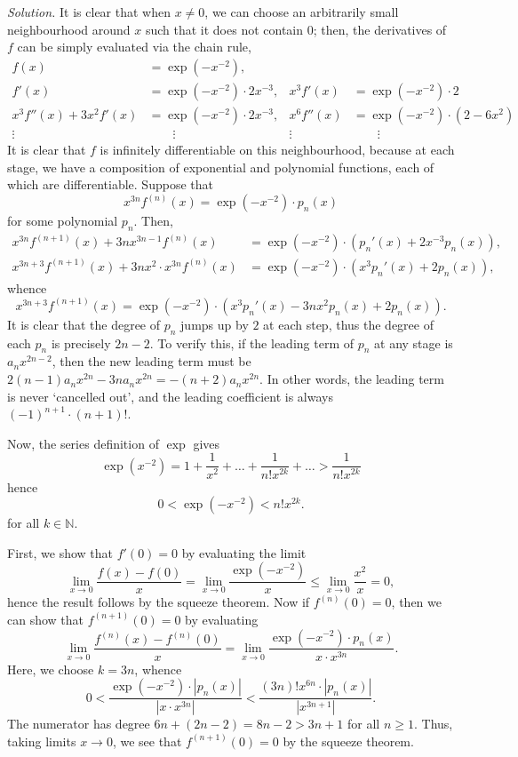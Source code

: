 \documentclass[11pt]{report}
\newcommand{\N}{\mathbb{N}}
\newcommand{\solution}{\noindent\textit{Solution.} }
\begin{document}
    \solution It is clear that when $x \neq 0$, we can choose an arbitrarily small
    neighbourhood around $x$ such that it does not contain $0$; then, the derivatives
    of $f$ can be simply evaluated via the chain rule, \begin{align*}
        f(x) &= \exp(-x^{-2}), \\
        f'(x) &= \exp(-x^{-2}) \cdot 2x^{-3}, & x^3 f'(x) &= \exp(-x^{-2})\cdot 2 \\
        x^3f''(x) + 3x^2f'(x) &= \exp(-x^{-2})\cdot 2x^{-3}, &
            x^6 f''(x) &= \exp(-x^{-2})\cdot (2 - 6x^2)\\
        \vdots & \qquad \vdots & \vdots & \qquad \vdots
    \end{align*}
    It is clear that $f$ is infinitely differentiable on this neighbourhood, because
    at each stage, we have a composition of exponential and polynomial functions,
    each of which are differentiable. Suppose that \[
        x^{3n}f^{(n)}(x) = \exp(-x^{-2}) \cdot p_n(x)
    \] for some polynomial $p_n$. Then, \begin{align*}
        x^{3n}f^{(n + 1)}(x) + 3nx^{3n - 1}f^{(n)}(x) &= \exp(-x^{-2})\cdot (p_n'(x)
        + 2x^{-3}p_n(x)), \\
        x^{3n + 3}f^{(n + 1)}(x) + 3nx^2\cdot x^{3n}f^{(n)}(x) &= \exp(-x^{-2})\cdot
        (x^3p_n'(x) + 2p_n(x)),
    \end{align*}
    whence \[
        x^{3n + 3}f^{(n + 1)}(x) = \exp(-x^{-2})\cdot (x^3p_n'(x) - 3nx^2 p_n(x) +
        2p_n(x)).
    \] It is clear that the degree of $p_n$ jumps up by $2$ at each step, thus the
    degree of each $p_n$ is precisely $2n - 2$. To verify this, if the leading term
    of $p_n$ at any stage is $a_nx^{2n - 2}$, then the new leading term must be $2(n
    - 1)a_n x^{2n} - 3na_nx^{2n} = -(n + 2)a_n x^{2n}$. In other words, the leading
    term is never `cancelled out', and the leading coefficient is always $(-1)^{n +
    1} \cdot (n + 1)!$.

    Now, the series definition of $\exp$ gives \[
        \exp(x^{-2}) = 1 + \frac{1}{x^2} + \dots + \frac{1}{n!x^{2k}} + \dots >
        \frac{1}{n!x^{2k}}
    \] hence \[
        0 < \exp(-x^{-2}) < n!x^{2k}.
    \] for all $k \in \N$.

    First, we show that $f'(0) = 0$ by evaluating the limit \[
        \lim_{x \to 0} \frac{f(x) - f(0)}{x} = \lim_{x \to 0} \frac{\exp(-x^{-2})}{x}
        \leq \lim_{x \to 0} \frac{x^2}{x} = 0,
    \] hence the result follows by the squeeze theorem. Now if $f^{(n)}(0) = 0$, then
    we can show that $f^{(n + 1)}(0) = 0$ by evaluating \[
        \lim_{x \to 0} \frac{f^{(n)}(x) - f^{(n)}(0)}{x} = \lim_{x \to 0}
        \frac{\exp(-x^{-2}) \cdot p_n(x)}{x\cdot x^{3n}}.
    \] Here, we choose $k = 3n$, whence \[
        0 < \frac{\exp(-x^{-2}) \cdot |p_n(x)|}{|x\cdot x^{3n}|} < \frac{(3n)! x^{6n}
        \cdot |p_n(x)|}{|x^{3n + 1}|}.
    \] The numerator has degree $6n + (2n - 2) = 8n - 2 > 3n + 1$ for all $n \geq 1$.
    Thus, taking limits $x \to 0$, we see that $f^{(n + 1)}(0) = 0$ by the squeeze
    theorem.
\end{document}
